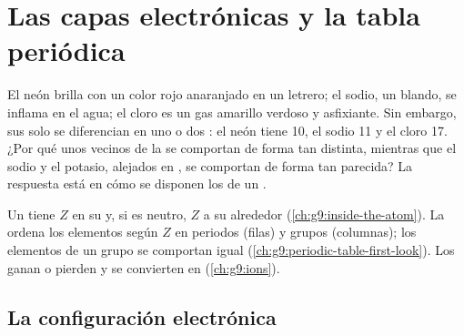 \chapter{Las capas electrónicas y la tabla periódica}\label{ch:g10:electron-shells}

El neón brilla con un color rojo anaranjado en un letrero; el sodio, un
 blando, se inflama en el agua; el cloro es un gas amarillo verdoso
y asfixiante. Sin embargo, sus  solo se diferencian en uno o dos
: el neón tiene 10, el sodio 11 y el cloro 17. ¿Por qué unos
vecinos de la  se comportan de forma tan distinta,
mientras que el sodio y el potasio, alejados en , se
comportan de forma tan parecida? La respuesta está en cómo se disponen
los  de un .

\begin{recall}
Un  tiene $Z$  en su  y, si es neutro, $Z$ 
a su alrededor (\cref{ch:g9:inside-the-atom}). La  ordena
los elementos según $Z$ en periodos (filas) y grupos (columnas); los
elementos de un grupo se comportan igual (\cref{ch:g9:periodic-table-first-look}).
Los  ganan o pierden  y se convierten en 
(\cref{ch:g9:ions}).
\end{recall}

\section{La configuración electrónica}

